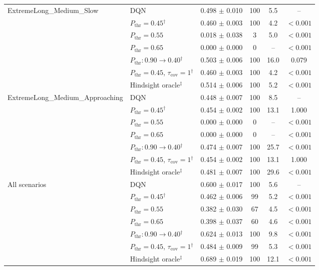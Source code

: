 \begin{table}[htbp]
\begin{tabular}{llcccc}
\midrule
\multirow{7}{*}{ExtremeLong\_Medium\_Slow} & DQN & 0.498 $\pm$ 0.010 & 100 & 5.5 & -- \\
 & $P_{\mathrm{thr}}=0.45$$^{\dagger}$ & 0.460 $\pm$ 0.003 & 100 & 4.2 & $<0.001$ \\
 & $P_{\mathrm{thr}}=0.55$ & 0.018 $\pm$ 0.038 & 3 & 5.0 & $<0.001$ \\
 & $P_{\mathrm{thr}}=0.65$ & 0.000 $\pm$ 0.000 & 0 & -- & $<0.001$ \\
 & $P_{\mathrm{thr}}: 0.90 \to 0.40$$^{\dagger}$ & 0.503 $\pm$ 0.006 & 100 & 16.0 & 0.079 \\
 & $P_{\mathrm{thr}}=0.45$, $\tau_{\mathrm{cov}}=1$$^{\dagger}$ & 0.460 $\pm$ 0.003 & 100 & 4.2 & $<0.001$ \\
 & Hindsight oracle$^{\ddagger}$ & 0.514 $\pm$ 0.006 & 100 & 5.2 & $<0.001$ \\
\midrule
\multirow{7}{*}{ExtremeLong\_Medium\_Approaching} & DQN & 0.448 $\pm$ 0.007 & 100 & 8.5 & -- \\
 & $P_{\mathrm{thr}}=0.45$$^{\dagger}$ & 0.454 $\pm$ 0.002 & 100 & 13.1 & 1.000 \\
 & $P_{\mathrm{thr}}=0.55$ & 0.000 $\pm$ 0.000 & 0 & -- & $<0.001$ \\
 & $P_{\mathrm{thr}}=0.65$ & 0.000 $\pm$ 0.000 & 0 & -- & $<0.001$ \\
 & $P_{\mathrm{thr}}: 0.90 \to 0.40$$^{\dagger}$ & 0.474 $\pm$ 0.007 & 100 & 25.7 & $<0.001$ \\
 & $P_{\mathrm{thr}}=0.45$, $\tau_{\mathrm{cov}}=1$$^{\dagger}$ & 0.454 $\pm$ 0.002 & 100 & 13.1 & 1.000 \\
 & Hindsight oracle$^{\ddagger}$ & 0.481 $\pm$ 0.007 & 100 & 29.6 & $<0.001$ \\
\midrule
\multirow{7}{*}{All scenarios} & DQN & 0.600 $\pm$ 0.017 & 100 & 5.6 & -- \\
 & $P_{\mathrm{thr}}=0.45$$^{\dagger}$ & 0.462 $\pm$ 0.006 & 99 & 5.2 & $<0.001$ \\
 & $P_{\mathrm{thr}}=0.55$ & 0.382 $\pm$ 0.030 & 67 & 4.5 & $<0.001$ \\
 & $P_{\mathrm{thr}}=0.65$ & 0.398 $\pm$ 0.037 & 60 & 4.6 & $<0.001$ \\
 & $P_{\mathrm{thr}}: 0.90 \to 0.40$$^{\dagger}$ & 0.624 $\pm$ 0.013 & 100 & 9.8 & $<0.001$ \\
 & $P_{\mathrm{thr}}=0.45$, $\tau_{\mathrm{cov}}=1$$^{\dagger}$ & 0.484 $\pm$ 0.009 & 99 & 5.3 & $<0.001$ \\
 & Hindsight oracle$^{\ddagger}$ & 0.689 $\pm$ 0.019 & 100 & 12.1 & $<0.001$ \\
\bottomrule
\end{tabular}
\end{table}
